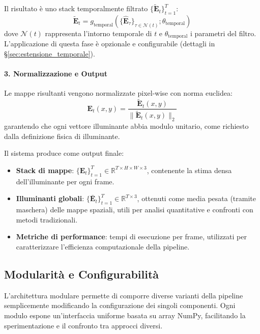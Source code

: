 Il risultato è uno stack temporalmente filtrato $\{\tilde{\mathbf{E}}_t\}_{t=1}^T$:
\begin{equation}
    \tilde{\mathbf{E}}_t = g_{\text{temporal}}(\{\hat{\mathbf{E}}_\tau\}_{\tau \in \mathcal{N}(t)}; \theta_{\text{temporal}})
    \label{eq:temporal_filtering}
\end{equation}
dove $\mathcal{N}(t)$ rappresenta l'intorno temporale di $t$ e $\theta_{\text{temporal}}$ i parametri del filtro. L'applicazione di questa fase è opzionale e configurabile (dettagli in \S\ref{sec:estensione_temporale}).

\paragraph{3. Normalizzazione e Output}
Le mappe risultanti vengono normalizzate pixel-wise con norma euclidea:
\begin{equation}
    \mathbf{E}_t(x,y) = \frac{\tilde{\mathbf{E}}_t(x,y)}{\|\tilde{\mathbf{E}}_t(x,y)\|_2}
    \label{eq:l2_normalization}
\end{equation}
garantendo che ogni vettore illuminante abbia modulo unitario, come richiesto dalla definizione fisica di illuminante.

Il sistema produce come output finale:
\begin{itemize}
    \item \textbf{Stack di mappe}: $\{\mathbf{E}_t\}_{t=1}^T \in \mathbb{R}^{T \times H \times W \times 3}$, contenente la stima densa dell'illuminante per ogni frame.
    \item \textbf{Illuminanti globali}: $\{\bar{\mathbf{E}}_t\}_{t=1}^T \in \mathbb{R}^{T \times 3}$, ottenuti come media pesata (tramite maschera) delle mappe spaziali, utili per analisi quantitative e confronti con metodi tradizionali.
    \item \textbf{Metriche di performance}: tempi di esecuzione per frame, utilizzati per caratterizzare l'efficienza computazionale della pipeline.
\end{itemize}

\subsection{Modularità e Configurabilità}
L'architettura modulare permette di comporre diverse varianti della pipeline semplicemente modificando la configurazione dei singoli componenti. Ogni modulo espone un'interfaccia uniforme basata su array NumPy, facilitando la sperimentazione e il confronto tra approcci diversi.

